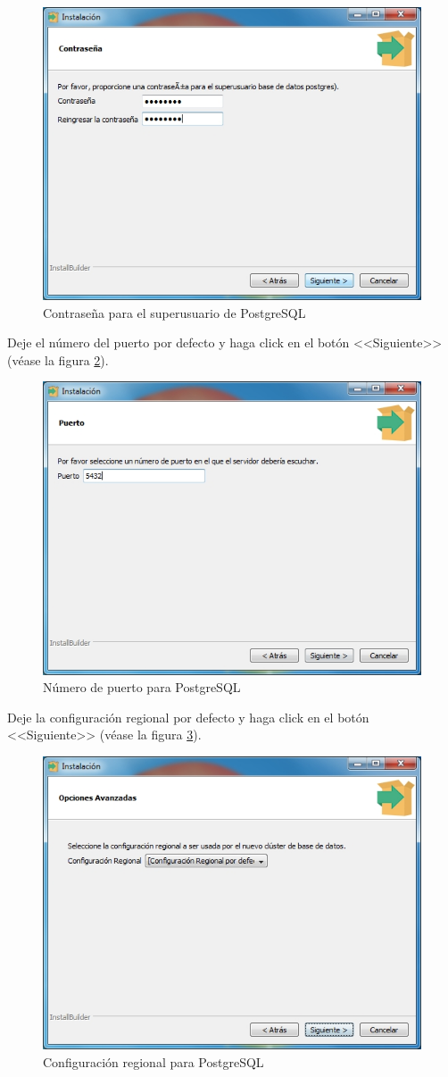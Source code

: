 \begin{figure}[H]
  \centering
  \includegraphics[width=.6\linewidth]{./img/postgres4.jpg}
\caption[Contrase\~{n}a para el superusuario de PostgreSQL]{Contrase\~{n}a para el superusuario de PostgreSQL\label{fig:postgres4}}
\end{figure}

\newpage

Deje el n\'{u}mero del puerto por defecto y haga click en el bot\'{o}n <<Siguiente>> (v\'{e}ase la figura \ref{fig:postgres5}).

\begin{figure}[H]
  \centering
  \includegraphics[width=.6\linewidth]{./img/postgres5.jpg}
\caption[N\'{u}mero de puerto para PostgreSQL]{N\'{u}mero de puerto para PostgreSQL\label{fig:postgres5}}
\end{figure}

Deje la configuraci\'{o}n regional por defecto y haga click en el bot\'{o}n <<Siguiente>> (v\'{e}ase la figura \ref{fig:postgres6}).

\begin{figure}[H]
  \centering
  \includegraphics[width=.6\linewidth]{./img/postgres6.jpg}
\caption[Configuraci\'{o}n regional para PostgreSQL]{Configuraci\'{o}n regional para PostgreSQL\label{fig:postgres6}}
\end{figure}

